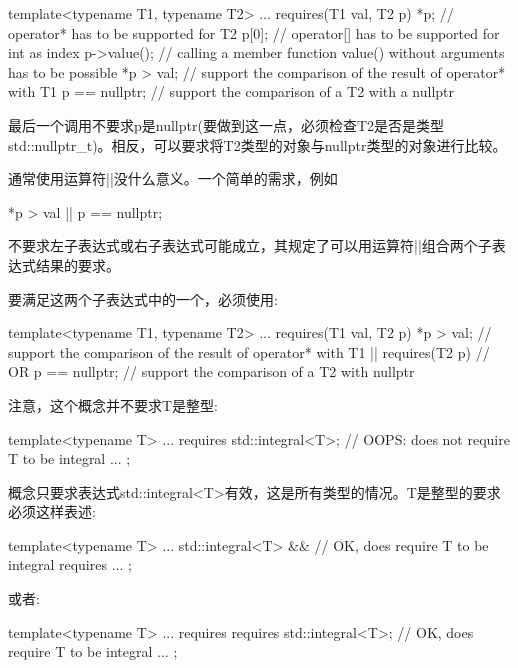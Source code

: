 \begin{cpp}
template<typename T1, typename T2>
... requires(T1 val, T2 p) {
		*p; // operator* has to be supported for T2
		p[0]; // operator[] has to be supported for int as index
		p->value(); // calling a member function value() without arguments has to be possible
		*p > val; // support the comparison of the result of operator* with T1
		p == nullptr; // support the comparison of a T2 with a nullptr
	}
\end{cpp}

最后一个调用不要求p是nullptr(要做到这一点，必须检查T2是否是类型std::nullptr\_t)。相反，可以要求将T2类型的对象与nullptr类型的对象进行比较。

通常使用运算符||没什么意义。一个简单的需求，例如

\begin{cpp}
*p > val || p == nullptr;
\end{cpp}

不要求左子表达式或右子表达式可能成立，其规定了可以用运算符||组合两个子表达式结果的要求。

要满足这两个子表达式中的一个，必须使用:

\begin{cpp}
template<typename T1, typename T2>
... requires(T1 val, T2 p) {
		*p > val; // support the comparison of the result of operator* with T1
	}
	|| requires(T2 p) { // OR
		p == nullptr; // support the comparison of a T2 with nullptr
	}
\end{cpp}

注意，这个概念并不要求T是整型:

\begin{cpp}
template<typename T>
... requires {
		std::integral<T>; // OOPS: does not require T to be integral
		...
	};
\end{cpp}

概念只要求表达式std::integral<T>有效，这是所有类型的情况。T是整型的要求必须这样表述:

\begin{cpp}
template<typename T>
... std::integral<T> && // OK, does require T to be integral
	requires {
		...
	};
\end{cpp}

或者:

\begin{cpp}
template<typename T>
... requires {
		requires std::integral<T>; // OK, does require T to be integral
		...
	};
\end{cpp}


